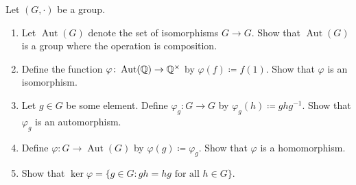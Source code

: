 \documentclass[../main.tex]{subfiles}
\begin{document}
\begin{homework}
    Let $(G,\cdot)$ be a group.
    \begin{enumerate}[label=(\alph*)]
        \item Let $\operatorname{Aut}(G)$ denote the set of isomorphisms $G\to G$. Show that $\operatorname{Aut}(G)$ is a group where the operation is composition.
        \item Define the function $\varphi\colon\operatorname{Aut}(\mathbb Q)\to\mathbb Q^\times$ by $\varphi(f)\coloneqq f(1)$. Show that $\varphi$ is an isomorphism.
        \item Let $g\in G$ be some element. Define $\varphi_g\colon G\to G$ by $\varphi_g(h)\coloneqq ghg^{-1}$. Show that $\varphi_g$ is an automorphism.
        \item Define $\varphi\colon G\to\operatorname{Aut}(G)$ by $\varphi(g)\coloneqq\varphi_g$. Show that $\varphi$ is a homomorphism.
        \item Show that $\ker\varphi=\{g\in G:gh=hg\text{ for all }h\in G\}$.
    \end{enumerate}
\end{homework}

\end{document}
